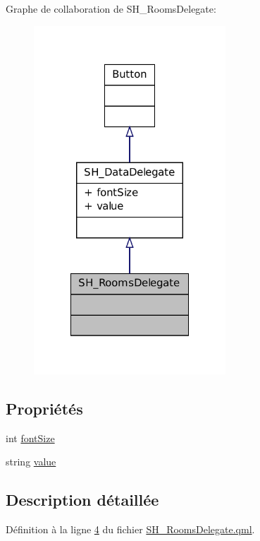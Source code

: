 Graphe de collaboration de S\-H\-\_\-\-Rooms\-Delegate\-:
\nopagebreak
\begin{figure}[H]
\begin{center}
\leavevmode
\includegraphics[width=204pt]{classSH__RoomsDelegate__coll__graph}
\end{center}
\end{figure}
\subsection*{Propriétés}
\begin{DoxyCompactItemize}
\item 
int \hyperlink{classSH__DataDelegate_afbb41ad9b513c7f27e7b5ad90d82e95b}{font\-Size}
\item 
string \hyperlink{classSH__DataDelegate_acb9da3c73493c88865e08d9575f26482}{value}
\end{DoxyCompactItemize}


\subsection{Description détaillée}


Définition à la ligne \hyperlink{SH__RoomsDelegate_8qml_source_l00004}{4} du fichier \hyperlink{SH__RoomsDelegate_8qml_source}{S\-H\-\_\-\-Rooms\-Delegate.\-qml}.



